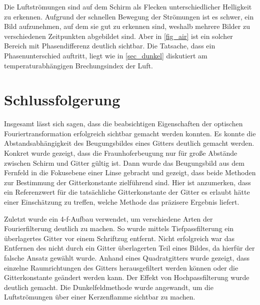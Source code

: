 \documentclass[
	a4paper,
	12pt,
	pagesize,
	ngerman
]{scrartcl}
\begin{document}
	Die Luftströmungen sind auf dem Schirm als Flecken unterschiedlicher Helligkeit zu erkennen.
	Aufgrund der schnellen Bewegung der Strömungen ist es schwer, ein Bild aufzunehmen, auf dem sie gut zu erkennen sind, weshalb mehrere Bilder zu verschiedenen Zeitpunkten abgebildet sind.
	Aber in \cref{fig_air} ist ein solcher Bereich mit Phasendifferenz deutlich sichtbar.
	Die Tatsache, dass ein Phasenunterschied auftritt, liegt wie in \cref{sec_dunkel} diskutiert am temperaturabhängigen Brechungsindex der Luft.



	\section{Schlussfolgerung}
	Insgesamt lässt sich sagen, dass die beabsichtigen Eigenschaften der optischen Fouriertransformation erfolgreich sichtbar gemacht werden konnten.
	Es konnte die Abstandsabhängigkeit des Beugungsbildes eines Gitters deutlich gemacht werden.
	Konkret wurde gezeigt, dass die Fraunhoferbeugung nur für große Abstände zwischen Schirm und Gitter gültig ist.
	Dann wurde das Beugungsbild aus dem Fernfeld in die Fokusebene einer Linse gebracht und gezeigt, dass beide Methoden zur Bestimmung der Gitterkonstante zielführend sind.
	Hier ist anzumerken, dass ein Referenzwert für die tatsächliche Gitterkonstante der Gitter es erlaubt hätte einer Einschätzung zu treffen, welche Methode das präzisere Ergebnis liefert.

	Zuletzt wurde ein 4-f-Aufbau verwendet, um verschiedene Arten der Fourierfilterung deutlich zu machen.
	So wurde mittels Tiefpassfilterung ein überlagertes Gitter vor einem Schriftzug entfernt.
	Nicht erfolgreich war das Entfernen des nicht durch ein Gitter überlagerten Teil eines Bildes, da hierfür der falsche Ansatz gewählt wurde.
	Anhand eines Quadratgitters wurde gezeigt, dass einzelne Raumrichtungen des Gitters herausgefiltert werden können oder die Gitterkonstante geändert werden kann.
	Der Effekt von Hochpassfilterung wurde deutlich gemacht.
	Die Dunkelfeldmethode wurde angewandt, um die Luftströmungen über einer Kerzenflamme sichtbar zu machen.

	\printbibliography
\end{document}
